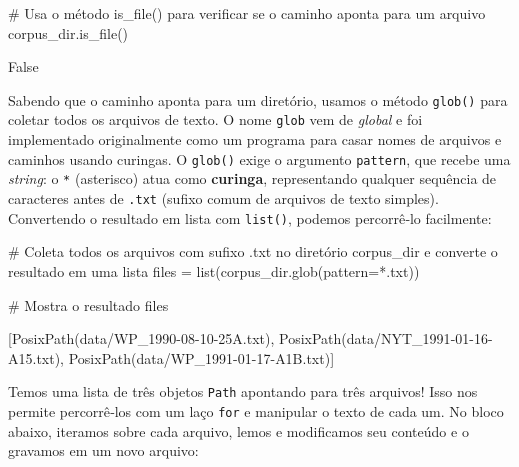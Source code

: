 \documentclass[
  brazilian,
  11pt,
]{article}
\newenvironment{Shaded}{\begin{snugshade}}{\end{snugshade}}
\newcommand{\BuiltInTok}[1]{\textcolor[rgb]{0.50,0.55,0.55}{#1}}
\newcommand{\CommentTok}[1]{\textcolor[rgb]{0.48,0.49,0.49}{#1}}
\newcommand{\NormalTok}[1]{\textcolor[rgb]{0.81,0.81,0.76}{#1}}
\newcommand{\OperatorTok}[1]{\textcolor[rgb]{0.81,0.81,0.76}{#1}}
\newcommand{\StringTok}[1]{\textcolor[rgb]{0.96,0.31,0.31}{#1}}
\let\oldtexttt\texttt
\renewcommand{\texttt}[1]{{\color{inlink}\oldtexttt{#1}}}
\begin{document}
\begin{Shaded}
\begin{Highlighting}[]
\CommentTok{\# Usa o método is\_file() para verificar se o caminho aponta para um arquivo}
\NormalTok{corpus\_dir.is\_file()}
\end{Highlighting}
\end{Shaded}

\begin{Shaded}
\begin{Highlighting}[]
\NormalTok{False}
\end{Highlighting}
\end{Shaded}

Sabendo que o caminho aponta para um diretório, usamos o método
\texttt{glob()} para coletar todos os arquivos de texto. O nome
\texttt{glob} vem de \emph{global} e foi implementado originalmente como
um programa para casar nomes de arquivos e caminhos usando curingas. O
\texttt{glob()} exige o argumento \texttt{pattern}, que recebe uma
\emph{string}: o \texttt{*} (asterisco) atua como \textbf{curinga},
representando qualquer sequência de caracteres antes de \texttt{.txt}
(sufixo comum de arquivos de texto simples). Convertendo o resultado em
lista com \texttt{list()}, podemos percorrê‑lo facilmente:

\begin{Shaded}
\begin{Highlighting}[]
\CommentTok{\# Coleta todos os arquivos com sufixo .txt no diretório \textquotesingle{}corpus\_dir\textquotesingle{} e converte o resultado em uma lista}
\NormalTok{files }\OperatorTok{=} \BuiltInTok{list}\NormalTok{(corpus\_dir.glob(pattern}\OperatorTok{=}\StringTok{\textquotesingle{}*.txt\textquotesingle{}}\NormalTok{))}

\CommentTok{\# Mostra o resultado}
\NormalTok{files}
\end{Highlighting}
\end{Shaded}

\begin{Shaded}
\begin{Highlighting}[]
\NormalTok{[PosixPath(\textquotesingle{}data/WP\_1990{-}08{-}10{-}25A.txt\textquotesingle{}),}
\NormalTok{ PosixPath(\textquotesingle{}data/NYT\_1991{-}01{-}16{-}A15.txt\textquotesingle{}),}
\NormalTok{ PosixPath(\textquotesingle{}data/WP\_1991{-}01{-}17{-}A1B.txt\textquotesingle{})]}
\end{Highlighting}
\end{Shaded}

Temos uma lista de três objetos \texttt{Path} apontando para três
arquivos! Isso nos permite percorrê‑los com um laço \texttt{for} e
manipular o texto de cada um. No bloco abaixo, iteramos sobre cada
arquivo, lemos e modificamos seu conteúdo e o gravamos em um novo
arquivo:
\end{document}
